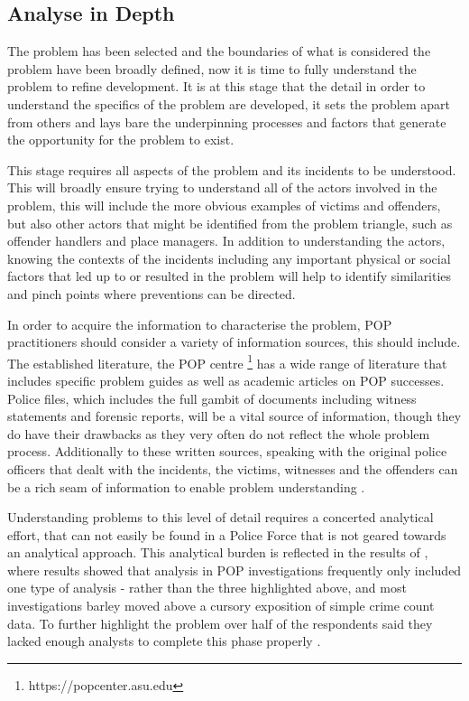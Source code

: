 \subsection{Analyse in Depth} The problem has been selected and the boundaries of what is considered the problem have been broadly defined, now it is time to fully understand the problem to refine development.  It is at this stage that the detail in order to understand the specifics of the problem are developed, it sets the problem apart from others and lays bare the underpinning processes and factors that generate the opportunity for the problem to exist. 

This stage requires all aspects of the problem and its incidents to be understood\parencite{clarke2003becoming}. This will broadly ensure trying to understand all of the actors involved in the problem, this will include the more obvious examples of victims and offenders, but also other actors that might be identified from the problem triangle, such as offender handlers and place managers. In addition to understanding the actors, knowing the contexts of the incidents including any important physical or social factors that led up to or resulted in the problem will help to identify similarities and pinch points where preventions can be directed. 

In order to acquire the information to characterise the problem, POP practitioners should consider a variety of information sources, this should include. The established literature, the POP centre \footnote{https://popcenter.asu.edu} has a wide range of literature that includes specific problem guides as well as academic articles on POP successes. Police files, which includes the full gambit of documents including witness statements and forensic reports, will be a vital source of information, though they do have their drawbacks as they very often do not reflect the whole problem process. Additionally to these written sources, speaking with the original police officers that dealt with the incidents, the victims, witnesses and the offenders can be a rich seam of information to enable problem understanding \parencite{goldstein1990}. 

Understanding problems to this level of detail requires a concerted analytical effort, that can not easily be found in a Police Force that is not geared towards an analytical approach. This analytical burden is reflected in the results of \parencite{POPUCL}, where results showed that analysis in POP investigations frequently only included one type of analysis - rather than the three highlighted above, and most investigations barley moved above a cursory exposition of simple crime count data.  To further highlight the problem over half of the respondents said they lacked enough analysts to complete this phase properly \parencite{POPUCL}. 

